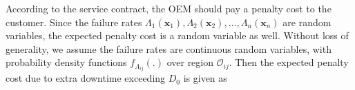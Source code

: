 \documentclass[preprint,12pt]{elsarticle}
\begin{document}
According to the service contract, the OEM should pay a penalty cost to the customer. Since the failure rates $\Lambda_{1}(\boldsymbol{x}_{1}),\Lambda_{2}(\boldsymbol{x}_{2}),...,\Lambda_{n}(\boldsymbol{x}_{n})$ are random variables, the expected penalty cost is a random variable as well. Without loss of generality, we assume the failure rates are continuous random variables, with probability density functions $f_{\Lambda_{ij}}(.)$ over region $\mathcal{O}_{ij}$. Then the expected penalty cost due to extra downtime exceeding $D_{0}$ is given as
\small
\end{document}
